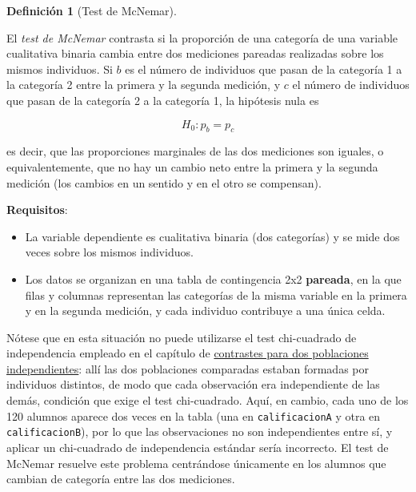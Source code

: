 \documentclass[
  spanish,
  a4paper,
]{scrreport}
\providecommand{\tightlist}{%
  \setlength{\itemsep}{0pt}\setlength{\parskip}{0pt}}
\theoremstyle{definition}
\theoremstyle{definition}
\newtheorem{definition}{Definición}[chapter]
\theoremstyle{remark}
\begin{document}
\begin{definition}[Test de
McNemar]\protect\hypertarget{def-dospareadas-mcnemar}{}\label{def-dospareadas-mcnemar}

El \emph{test de McNemar} contrasta si la proporción de una categoría de
una variable cualitativa binaria cambia entre dos mediciones pareadas
realizadas sobre los mismos individuos. Si \(b\) es el número de
individuos que pasan de la categoría 1 a la categoría 2 entre la primera
y la segunda medición, y \(c\) el número de individuos que pasan de la
categoría 2 a la categoría 1, la hipótesis nula es

\[H_0: p_b = p_c\]

es decir, que las proporciones marginales de las dos mediciones son
iguales, o equivalentemente, que no hay un cambio neto entre la primera
y la segunda medición (los cambios en un sentido y en el otro se
compensan).

\end{definition}

\textbf{Requisitos}:

\begin{itemize}
\tightlist
\item
  La variable dependiente es cualitativa binaria (dos categorías) y se
  mide dos veces sobre los mismos individuos.
\item
  Los datos se organizan en una tabla de contingencia 2x2
  \textbf{pareada}, en la que filas y columnas representan las
  categorías de la misma variable en la primera y en la segunda
  medición, y cada individuo contribuye a una única celda.
\end{itemize}

Nótese que en esta situación no puede utilizarse el test chi-cuadrado de
independencia empleado en el capítulo de
\hyperref[contrastes-para-dos-poblaciones-independientes]{contrastes
para dos poblaciones independientes}: allí las dos poblaciones
comparadas estaban formadas por individuos distintos, de modo que cada
observación era independiente de las demás, condición que exige el test
chi-cuadrado. Aquí, en cambio, cada uno de los 120 alumnos aparece dos
veces en la tabla (una en \texttt{calificacionA} y otra en
\texttt{calificacionB}), por lo que las observaciones no son
independientes entre sí, y aplicar un chi-cuadrado de independencia
estándar sería incorrecto. El test de McNemar resuelve este problema
centrándose únicamente en los alumnos que cambian de categoría entre las
dos mediciones.
\end{document}
